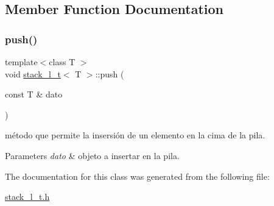 \subsection{Member Function Documentation}
\mbox{\label{classstack__l__t_ad52c8e787c587fa5d15bd0e3eea5814c}} 
\subsubsection{\texorpdfstring{push()}{push()}}
{\footnotesize\ttfamily template$<$class T $>$ \\
void \hyperlink{classstack__l__t}{stack\+\_\+l\+\_\+t}$<$ T $>$\+::push (\begin{DoxyParamCaption}\item[{const T \&}]{dato }\end{DoxyParamCaption})}



método que permite la insersión de un elemento en la cima de la pila. 


\begin{DoxyParams}{Parameters}
{\em dato} & objeto a insertar en la pila. \\
\hline
\end{DoxyParams}


The documentation for this class was generated from the following file\+:\begin{DoxyCompactItemize}
\item 
\hyperlink{stack__l__t_8h}{stack\+\_\+l\+\_\+t.\+h}\end{DoxyCompactItemize}
